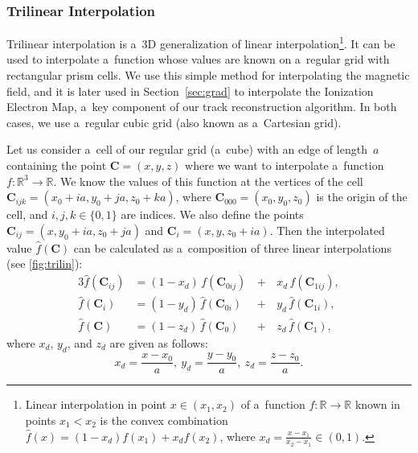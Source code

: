 			\subsubsection{Trilinear Interpolation}
			\label{sec:trilin}
				Trilinear interpolation is a~3D generalization of linear interpolation\footnote{Linear interpolation in point $x\in(x_1,x_2)$ of a~function $f\colon\mathbb{R}\to\mathbb{R}$ known in points $x_1 < x_2$ is the convex combination $\widehat{f}(x) = (1-x_d)f(x_1)+x_d f(x_2)$, where $x_d = \frac{x-x_1}{x_2-x_1} \in (0,1)$.}. It can be used to interpolate a~function whose values are known on a~regular grid with rectangular prism cells. We use this simple method for interpolating the magnetic field, and it is later used in Section~\ref{sec:grad} to interpolate the Ionization Electron Map, a~key component of our track reconstruction algorithm. In both cases, we use a~regular cubic grid (also known as a~Cartesian grid).
				
				Let us consider a~cell of our regular grid (a~cube) with an edge of length~$a$ containing the point $\mathbf{C} = (x,y,z)$ where we want to interpolate a~function $f\colon\mathbb{R}^3\to\mathbb{R}$. We know the values of this function at the vertices of the cell $\mathbf{C}_{ijk} = (x_0+ia,y_0+ja,z_0+ka)$, where $\mathbf{C}_{000} = (x_0,y_0,z_0)$ is the origin of the cell, and $i,j,k \in \{0,1\}$ are indices. We also define the points $\mathbf{C}_{ij} = (x,y_0+ia,z_0+ja)$ and $\mathbf{C}_i=(x,y,z_0+ia)$. Then the interpolated value $\widehat{f}(\mathbf{C})$ can be calculated as a~composition of three linear interpolations (see \cref{fig:trilin}):
					\begin{alignat}{3}
						\label{eq:linterpol}
						\widehat{f}(\mathbf{C}_{ij}) &= (1-x_d)\,f(\mathbf{C}_{0ij}) \,&+&\,x_d\, f(\mathbf{C}_{1ij}),\\
						\label{eq:linterpol2}
						\widehat{f}(\mathbf{C}_{i}) &= (1-y_d)\,\widehat{f}(\mathbf{C}_{0i}) &+&\,y_d\, \widehat{f}(\mathbf{C}_{1i}),\\
						\label{eq:linterpol3}
						\widehat{f}(\mathbf{C}) &= (1-z_d)\,\widehat{f}(\mathbf{C}_0) &+&\,z_d\, \widehat{f}(\mathbf{C}_1),
					\end{alignat}
				where $x_d$, $y_d$, and $z_d$ are given as follows:
					\begin{equation}
						x_d = \frac{x-x_0}{a},~y_d = \frac{y-y_0}{a},~z_d = \frac{z-z_0}{a}.
					\end{equation}
					
